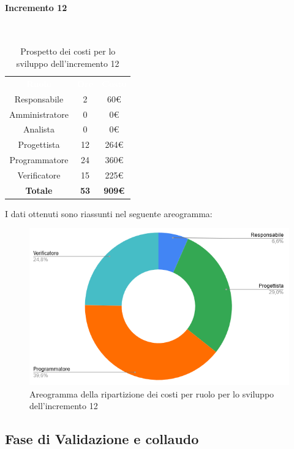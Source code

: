 \paragraph*{Incremento 12}\mbox{} \\
\begin{table}[H]
\centering\renewcommand{\arraystretch}{1.5}
\caption{Prospetto dei costi per lo sviluppo dell'incremento 12}
\vspace{0.2cm}
\begin{tabular}{ c c c }
\rowcolor{redafk}
\textcolor{white}{\textbf{Ruolo}} & \textcolor{white}{\textbf{Ore}} &
\textcolor{white}{\textbf{Costo}}  \\
Responsabile & 2 & 60€ \\
Amministratore & 0 & 0€ \\
Analista & 0 & 0€ \\
Progettista & 12 & 264€ \\
Programmatore & 24 & 360€  \\
Verificatore & 15 & 225€  \\
\rowcolor{lastrowcolor}
\textbf{Totale} & \textbf{53} & \textbf{909€}  \\
\end{tabular}
\end{table}
 
I dati ottenuti sono riassunti nel seguente areogramma:
\begin{figure}[H]
\centering
\includegraphics[scale=0.60]{img/grafici/torta_inc12.png}
\caption{Areogramma della ripartizione dei costi per ruolo per lo sviluppo dell'incremento 12}
\end{figure}


\subsection{Fase di Validazione e collaudo}
